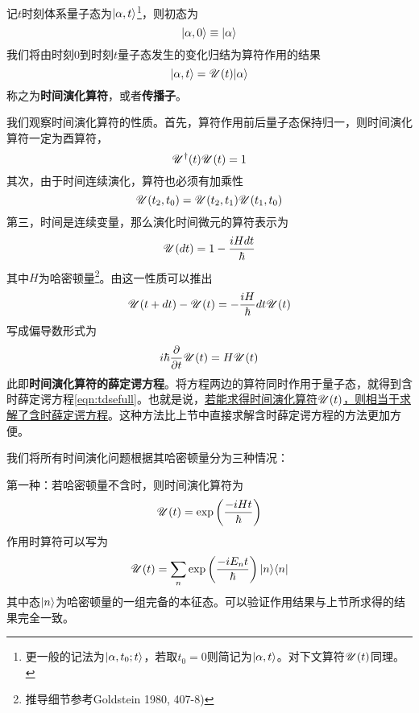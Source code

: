 记$ t $时刻体系量子态为$ |\alpha,t\rangle $\footnote{更一般的记法为$ |\alpha,t_0;t\rangle $，若取$ t_0=0 $则简记为$ |\alpha,t\rangle $。对下文算符$ \mathscr{U}(t) $同理。}，则初态为
\begin{equation}\label{key}
|\alpha,0\rangle\equiv|\alpha\rangle
\end{equation}
我们将由时刻0到时刻$ t $量子态发生的变化归结为算符作用的结果
\begin{equation}\label{key}
|\alpha,t\rangle=\mathscr{U}(t)|\alpha\rangle
\end{equation}
称之为\textbf{时间演化算符}，或者\textbf{传播子}。

我们观察时间演化算符的性质。首先，算符作用前后量子态保持归一，则时间演化算符一定为酉算符，
\begin{equation}\label{key}
\mathscr{U}^\dagger(t)\mathscr{U}(t)=1
\end{equation}
其次，由于时间连续演化，算符也必须有加乘性
\begin{equation}\label{key}
\mathscr{U}(t_2,t_0)=\mathscr{U}(t_2,t_1)\mathscr{U}(t_1,t_0)
\end{equation}
第三，时间是连续变量，那么演化时间微元的算符表示为
\begin{equation}\label{key}
\mathscr{U}(dt)=1-\dfrac{iHdt}{\hbar}
\end{equation}
其中$ H $为哈密顿量\footnote{推导细节参考Goldstein 1980, 407-8)}。由这一性质可以推出
\begin{equation}\label{key}
\mathscr{U}(t+dt)-\mathscr{U}(t)=-\dfrac{iH}{\hbar}dt\mathscr{U}(t)
\end{equation}
写成偏导数形式为
\begin{equation}\label{key}
i\hbar\dfrac{\partial}{\partial t}\mathscr{U}(t)=H\mathscr{U}(t)
\end{equation}
此即\textbf{时间演化算符的薛定谔方程}。将方程两边的算符同时作用于量子态，就得到含时薛定谔方程\eqref{eqn:tdsefull}。也就是说，\underline{若能求得时间演化算符$ \mathscr{U}(t) $，则相当于求解了含时薛定谔方程}。这种方法比上节中直接求解含时薛定谔方程的方法更加方便。

我们将所有时间演化问题根据其哈密顿量分为三种情况：

第一种：若哈密顿量不含时，则时间演化算符为
\begin{equation}\label{key}
\mathscr{U}(t)=\exp\left(\dfrac{-iHt}{\hbar}\right)
\end{equation}
作用时算符可以写为
\begin{equation}\label{eqn:1.2.9}
\mathscr{U}(t)=\sum_n\exp\left(\dfrac{-iE_nt}{\hbar}\right)|n\rangle\langle n|
\end{equation}
其中态$ |n\rangle $为哈密顿量的一组完备的本征态。可以验证作用结果与上节所求得的结果完全一致。


